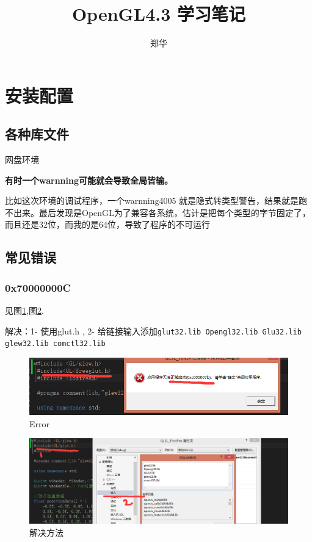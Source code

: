 \documentclass[UTF8,a4paper,8pt]{ctexart}
\author{\kaishu 郑华}
\title{\heiti OpenGL4.3  学习笔记}
\begin{document}
 	\maketitle
 
	\newpage
	\tableofcontents
	
\newpage
\section{安装配置}
    \subsection{各种库文件}网盘环境
    
    \textbf{有时一个warnning可能就会导致全局皆输。}
    
    比如这次环境的调试程序，一个warnning4005  就是隐式转类型警告，结果就是跑不出来。最后发现是OpenGL为了兼容各系统，估计是把每个类型的字节固定了，而且还是32位，而我的是64位，导致了程序的不可运行
    
    \subsection{常见错误}
	    \subsubsection{0x70000000C}见图\ref{Glut Error},图\ref{Glut_fix}.
	    
		    解决：1- 使用glut.h , 2- 给链接输入添加\verb|glut32.lib Opengl32.lib Glu32.lib glew32.lib comctl32.lib|
		    \begin{figure}[h]
		    	\begin{center}
					\includegraphics[scale = 0.5]{glutDoesNotMatchError.png}%
		    		\caption{Error}
		    		\label{Glut Error}
		    	\end{center}
		    \end{figure}
		    \begin{figure}[h]
		    	\centering
		    	\includegraphics[scale = 0.4]{glutMatch.png}
		    	\caption{解决方法}
		    	\label{Glut_fix}
		    \end{figure}
\end{document}
